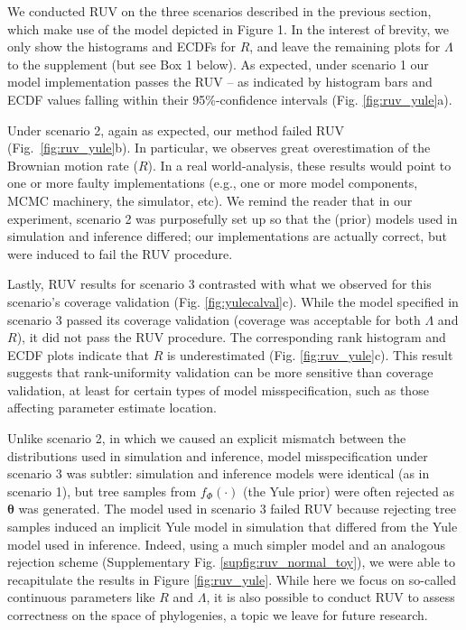 \documentclass[oneside]{article}
\begin{document}
We conducted RUV on the three scenarios described in the previous section, which make use of the model depicted in Figure 1.
In the interest of brevity, we only show the histograms and ECDFs for $R$, and leave the remaining plots for $\Lambda$ to the supplement (but see Box 1 below).
As expected, under scenario 1 our model implementation passes the RUV -- as indicated by histogram bars and ECDF values falling within their 95\%-confidence intervals (Fig. \ref{fig:ruv_yule}a).

Under scenario 2, again as expected, our method failed RUV (Fig.~\ref{fig:ruv_yule}b).
In particular, we observes great overestimation of the Brownian motion rate ($R$).
In a real world-analysis, these results would point to one or more faulty implementations (e.g., one or more model components, MCMC machinery, the simulator, etc).
We remind the reader that in our experiment, scenario 2 was purposefully set up so that the (prior) models used in simulation and inference differed; our implementations are actually correct, but were induced to fail the RUV procedure.

Lastly, RUV results for scenario 3 contrasted with what we observed for this scenario's coverage validation (Fig. \ref{fig:yulecalval}c).
While the model specified in scenario 3 passed its coverage validation (coverage was acceptable for both $\Lambda$ and $R$), it did not pass the RUV procedure.
The corresponding rank histogram and ECDF plots indicate that $R$ is underestimated (Fig. \ref{fig:ruv_yule}c).
This result suggests that rank-uniformity validation can be more sensitive than coverage validation, at least for certain types of model misspecification, such as those affecting parameter estimate location.

Unlike scenario 2, in which we caused an explicit mismatch between the distributions used in simulation and inference, model misspecification under scenario 3 was subtler: simulation and inference models were identical (as in scenario 1), but tree samples from $f_\Phi(\cdot)$ (the Yule prior) were often rejected as $\boldsymbol{\theta}$ was generated.
The model used in scenario 3 failed RUV because rejecting tree samples induced an implicit Yule model in simulation that differed from the Yule model used in inference. 
Indeed, using a much simpler model and an analogous rejection scheme (Supplementary Fig. \ref{supfig:ruv_normal_toy}), we were able to recapitulate the results in Figure \ref{fig:ruv_yule}.
While here we focus on so-called continuous parameters like $R$ and $\Lambda$, it is also possible to conduct RUV to assess correctness on the space of phylogenies, a topic we leave for future research.
\end{document}
